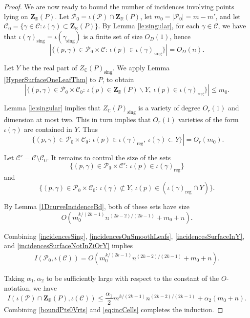 \documentclass[letterpaper, reqno,11pt]{article}
\theoremstyle{remark}
\newcommand{\RR}{\mathbb{R}}
\newcommand{\CC}{\mathbb{C}}
\newcommand{\BZ}{\mathbf{Z}}
\newcommand{\pts}{\mathcal P}
\newcommand{\curves}{\mathcal C}
\newcommand{\sing}{\operatorname{sing}}
\newcommand{\reg}{\operatorname{reg}}
\begin{document}
\begin{proof}
We are now ready to bound the number of incidences involving points lying on $\BZ_{\RR}(P)$. Let $\pts_0= \iota(\pts) \cap \BZ_{\RR}(P)$, let $m_0=|\pts_0|=m-m'$, and let $\curves_0=\{\gamma\in\curves\colon\iota(\gamma)\subset\BZ_{\RR}(P)\}$.
By Lemma \ref{le:singular}, for each $\gamma\in\curves$, we have that
  $\iota(\gamma)_{\sing}=\iota(\gamma_{\sing})$ is a finite set of size
  $O_D(1)$, hence
  \begin{equation}\label{incidencesSing}
    |\{(p,\gamma)\in \pts_0 \times \curves :\,
    \iota(p)\in\iota(\gamma)_{\sing}\}|=O_D(n).
  \end{equation}

Let $Y$ be the real part of $Z_{\CC}(P)_{\sing}$.
We apply Lemma \ref{HyperSurfaceOneLeafThm} to $P$, to obtain
\begin{equation}\label{incidencesOnSmoothLeafs}
|\{(p,\gamma)\in\pts_0\times \curves_0 :\, \iota(p)\in \BZ_{\RR}(P)\backslash Y,\ \iota(p)\in \iota(\gamma)_{\reg}\}|\leq m_0.
\end{equation}

 Lemma \ref{le:singular} implies that $Z_{\CC}(P)_{\sing}$ is a variety of degree $O_{r}(1)$ and dimension at most two.
 This in turn implies that $O_{r}(1)$ varieties of the form $\iota(\gamma)$ are contained in $Y$.
 Thus
\begin{equation}\label{incidencesSurfaceInY}
|\{(p,\gamma)\in\pts_0\times \curves_0 :\, \iota(p)\in \iota(\gamma)_{\reg},\ \iota(\gamma)\subset Y\}|=O_{r}(m_0).
\end{equation}
%

Let $\curves' = \curves \setminus \curves_0$.
It remains to control the size of the sets
\begin{equation*}
\{(p,\gamma)\in\pts_0\times \curves' :\, \iota(p)\in \iota(\gamma)_{\reg} \}
\end{equation*}
and
\begin{equation*}
\{(p,\gamma)\in\pts_0\times \curves_0 :\, \iota(\gamma)\not\subset Y, \, \iota(p)\in (\iota(\gamma)_{\reg} \cap Y) \}.
\end{equation*}

By Lemma \ref{1DcurveIncidenceBd}, both of these sets have size
\begin{equation}\label{incidencesSurfaceNotInZiOrY}
O(m_0^{k/(2k-1)}n^{(2k-2)/(2k-1)}+m_0+n).
\end{equation}

Combining \eqref{incidencesSing}, \eqref{incidencesOnSmoothLeafs}, \eqref{incidencesSurfaceInY}, and \eqref{incidencesSurfaceNotInZiOrY} implies
\begin{align*}
I(\pts_0,\iota(\curves)) =  O(m_0^{k/(2k-1)}n^{(2k-2)/(2k-1)}+m_0+n).
\end{align*}

Taking $\alpha_1,\alpha_2$ to be sufficiently large with respect to the constant of the $O$-notation, we have
%
\begin{equation}\label{boundPts0Vrts}
I(\iota(\pts)\cap\BZ_{\RR}(P), \iota(\curves)) \le \frac{\alpha_1}{2}m^{k/(2k-1)}n^{(2k-2)/(2k-1)}+\alpha_2(m_0+n).
\end{equation}
Combining \eqref{boundPts0Vrts} and \eqref{eq:incCells} completes the induction.
\end{proof}
\end{document}
